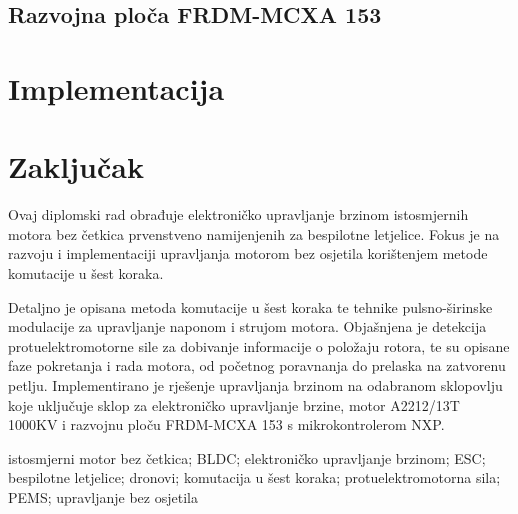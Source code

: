 \documentclass[diplomskirad]{fer}
\begin{document}
\section{Razvojna ploča FRDM-MCXA 153}

\chapter{Implementacija}
\label{pog:implementacija}

\chapter{Zaključak}
\label{pog:zakljucak}





\begin{sazetak}

	Ovaj diplomski rad obrađuje elektroničko upravljanje brzinom istosmjernih
	motora bez četkica prvenstveno namijenjenih za bespilotne letjelice. Fokus je
	na razvoju i implementaciji upravljanja motorom bez osjetila korištenjem metode
	komutacije u šest koraka.

	Detaljno je opisana metoda komutacije u šest koraka te tehnike pulsno-širinske
	modulacije za upravljanje naponom i strujom motora. Objašnjena je detekcija
	protuelektromotorne sile za dobivanje informacije o položaju rotora, te su
	opisane faze pokretanja i rada motora, od početnog poravnanja do prelaska na
	zatvorenu petlju. Implementirano je rješenje upravljanja brzinom na odabranom
	sklopovlju koje uključuje sklop za elektroničko upravljanje brzine, motor
	A2212/13T 1000KV i razvojnu ploču FRDM-MCXA 153 s mikrokontrolerom NXP.
\end{sazetak}

\begin{kljucnerijeci}
	istosmjerni motor bez četkica; BLDC; elektroničko upravljanje brzinom; ESC; bespilotne letjelice; dronovi; komutacija u šest koraka; protuelektromotorna sila; PEMS; upravljanje bez osjetila
\end{kljucnerijeci}
\end{document}
